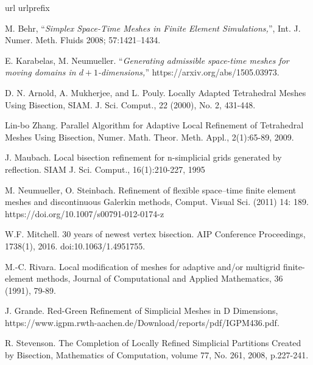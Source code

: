\documentclass[a4paper,12pt]{amsart}
\numberwithin{equation}{section}
\begin{document}
\begin{thebibliography}{99}
\expandafter\ifx\csname url\endcsname\relax
  \def\url#1{\texttt{#1}}\fi
\expandafter\ifx\csname urlprefix\endcsname\relax\def\urlprefix{URL }\fi

M. Behr, ``{\em Simplex Space-Time Meshes in Finite Element Simulations,}'',
Int. J. Numer. Meth. Fluids 2008; 57:1421–1434.

E. Karabelas, M. Neumueller. 
``{\em Generating admissible space-time meshes for moving domains in $d + 1$-dimensions,}''
https://arxiv.org/abs/1505.03973.

D. N. Arnold, A. Mukherjee, and L. Pouly. Locally Adapted Tetrahedral Meshes Using Bisection, SIAM. J. Sci. Comput., 22 (2000), No. 2, 431-448.

Lin-bo Zhang. Parallel Algorithm for Adaptive Local Refinement
of Tetrahedral Meshes Using Bisection, Numer. Math. Theor. Meth. Appl., 2(1):65-89, 2009.

J. Maubach. Local bisection refinement for n-simplicial grids generated by reflection. SIAM J. Sci. Comput., 16(1):210-227, 1995

M. Neumueller, O. Steinbach. Refinement of flexible space–time finite element meshes and discontinuous Galerkin methods, Comput. Visual Sci. (2011) 14: 189. https://doi.org/10.1007/s00791-012-0174-z

W.F. Mitchell. 30 years of newest vertex bisection. AIP Conference Proceedings, 1738(1), 2016. doi:10.1063/1.4951755.

M.-C. Rivara. Local modification of meshes for adaptive and/or 
multigrid finite-element methods, Journal of Computational and  Applied Mathematics, 36 (1991), 79-89.


J. Grande. Red-Green Refinement of Simplicial Meshes in D Dimensions, https://www.igpm.rwth-aachen.de/Download/reports/pdf/IGPM436.pdf.

R. Stevenson. The Completion of Locally Refined Simplicial Partitions Created by Bisection, Mathematics of Computation, volume 77, No. 261, 2008, p.227-241.

\end{thebibliography}
\end{document}
